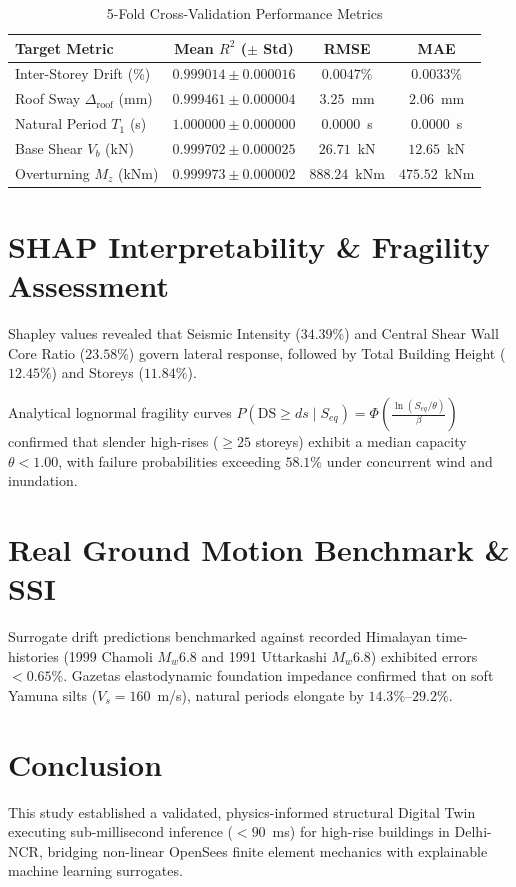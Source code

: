 \documentclass[journal,10pt,twocolumn]{IEEEtran}
\begin{document}
\begin{table}[htbp]
\caption{5-Fold Cross-Validation Performance Metrics}
\centering
\begin{tabular}{lccc}
\toprule
Target Metric & Mean $R^2$ ($\pm$ Std) & RMSE & MAE \\
\midrule
Inter-Storey Drift (\%) & $0.999014 \pm 0.000016$ & $0.0047\%$ & $0.0033\%$ \\
Roof Sway $\Delta_{\text{roof}}$ (mm) & $0.999461 \pm 0.000004$ & $3.25$~mm & $2.06$~mm \\
Natural Period $T_1$ (s) & $1.000000 \pm 0.000000$ & $0.0000$~s & $0.0000$~s \\
Base Shear $V_b$ (kN) & $0.999702 \pm 0.000025$ & $26.71$~kN & $12.65$~kN \\
Overturning $M_z$ (kNm) & $0.999973 \pm 0.000002$ & $888.24$~kNm & $475.52$~kNm \\
\bottomrule
\end{tabular}
\end{table}

\section{SHAP Interpretability \& Fragility Assessment}
Shapley values revealed that Seismic Intensity ($34.39\%$) and Central Shear Wall Core Ratio ($23.58\%$) govern lateral response, followed by Total Building Height ($12.45\%$) and Storeys ($11.84\%$).

Analytical lognormal fragility curves $P(\text{DS} \ge ds \mid S_{eq}) = \Phi\left(\frac{\ln(S_{eq}/\theta)}{\beta}\right)$ confirmed that slender high-rises ($\ge 25$ storeys) exhibit a median capacity $\theta < 1.00$, with failure probabilities exceeding $58.1\%$ under concurrent wind and inundation.

\section{Real Ground Motion Benchmark \& SSI}
Surrogate drift predictions benchmarked against recorded Himalayan time-histories (1999 Chamoli $M_w 6.8$ and 1991 Uttarkashi $M_w 6.8$) exhibited errors $< 0.65\%$. Gazetas elastodynamic foundation impedance confirmed that on soft Yamuna silts ($V_s = 160$~m/s), natural periods elongate by $14.3\%$--$29.2\%$.

\section{Conclusion}
This study established a validated, physics-informed structural Digital Twin executing sub-millisecond inference ($<90$~ms) for high-rise buildings in Delhi-NCR, bridging non-linear OpenSees finite element mechanics with explainable machine learning surrogates.
\end{document}
